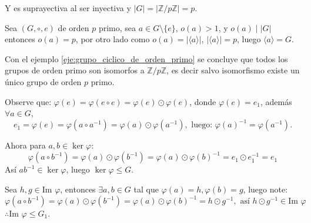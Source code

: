 Y es suprayectiva al ser inyectiva y $|G| = |\mathbb{Z}/p\mathbb{Z}| = p$.


\begin{enefecto}
	Sea $(G, \circ, e)$ de orden $p$ primo, sea $a \in G \setminus \{e\}$, $o(a) > 1$, y $o(a) \mid |G|$ entonces $o(a) = p$, por otro lado como $o(a) = |\langle a \rangle|$, $|\langle a \rangle| = p$, luego $\langle a \rangle = G$.
\end{enefecto}

Con el ejemplo \ref{eje:grupo_ciclico_de_orden_primo} se concluye que todos los grupos de orden primo son isomorfos a $\mathbb{Z}/p\mathbb{Z}$, es decir salvo isomorfismo existe un único grupo de orden $p$ primo.


\begin{enefecto}
	Observe que: $\varphi(e) = \varphi(e \circ e) = \varphi(e) \odot \varphi(e)$, donde $\varphi(e)=e_1$, además $\forall a \in G$,
	\begin{equation*}
		e_1 = \varphi(e) = \varphi(a \circ a^{-1}) = \varphi(a) \odot \varphi(a^{-1}), \text{ luego: } \varphi(a)^{-1} = \varphi(a^{-1}).
	\end{equation*}

	Ahora para $a, b \in \ker \varphi$:
	\begin{equation*}
		\varphi(a \circ b^{-1}) = \varphi(a) \odot \varphi(b^{-1}) = \varphi(a) \odot \varphi(b)^{-1} = e_1 \odot e_1^{-1} = e_1
	\end{equation*}
	Así $ab^{-1} \in \ker \varphi$, luego $\ker \varphi \le G$.

	Sea $h, g \in \text{Im } \varphi$, entonces $\exists a, b \in G$ tal que $\varphi(a)=h, \varphi(b)=g$, luego note:
	\begin{equation*}
		\varphi(a \circ b^{-1}) = \varphi(a) \odot \varphi(b^{-1}) = \varphi(a) \odot \varphi(b)^{-1} = h \odot g^{-1}, \text{ así } h \odot g^{-1} \in \text{Im } \varphi
	\end{equation*}
	$\therefore \text{Im } \varphi \le G_1$.
\end{enefecto}
